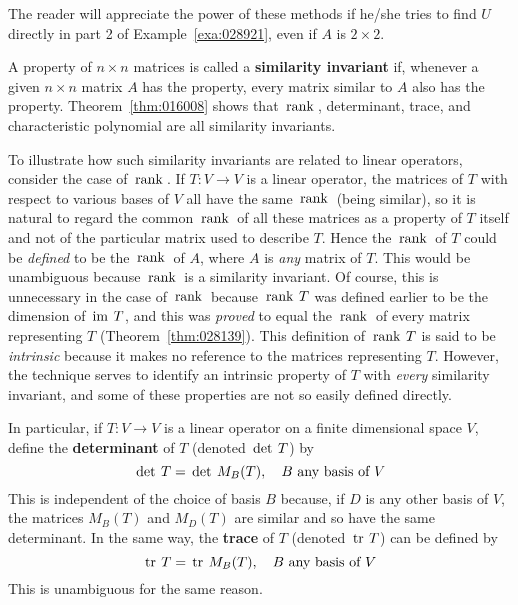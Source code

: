 \noindent The reader will appreciate the power of these methods if he/she tries to find $U$ directly in part 2 of Example~\ref{exa:028921}, even if $A$ is $2 \times 2$.


A property of $n \times n$ matrices is called a \textbf{similarity invariant} if, whenever a given $n \times n$ matrix $A$ has the property, every matrix similar to $A$ also has the property. Theorem~\ref{thm:016008} shows that $\thinspace\operatorname{rank\medspace}$, determinant, trace, and characteristic polynomial are all similarity invariants.


To illustrate how such similarity invariants are related to linear operators, consider the case of $\thinspace\operatorname{rank\medspace}$. If $T : V \to V$ is a linear operator, the matrices of $T$ with respect to various bases of $V$ all have the same $\thinspace\operatorname{rank\medspace}$ (being similar), so it is natural to regard the common $\thinspace\operatorname{rank\medspace}$ of all these matrices as a property of $T$ itself and not of the particular matrix used to describe $T$. Hence the $\thinspace\operatorname{rank\medspace}$ of $T$ could be \textit{defined} to be the $\thinspace\operatorname{rank\medspace}$ of $A$, where $A$ is \textit{any} matrix of $T$. This would be unambiguous because $\thinspace\operatorname{rank\medspace}$ is a similarity invariant. Of course, this is unnecessary in the case of $\thinspace\operatorname{rank\medspace}$ because $\thinspace\operatorname{rank \medspace}T$ was defined earlier to be the dimension of $\thinspace\operatorname{im \medspace}T$, and this was \textit{proved} to equal the $\thinspace\operatorname{rank\medspace}$ of every matrix representing $T$ (Theorem~\ref{thm:028139}). This definition of $\thinspace\operatorname{rank \medspace}T$ is said to be \textit{intrinsic} because it makes no reference to the matrices representing $T$. However, the technique serves to identify an intrinsic property of $T$ with \textit{every} similarity invariant, and some of these properties are not so easily defined directly.


In particular, if $T : V \to V$ is a linear operator on a finite dimensional space $V$, define the \textbf{determinant} of $T$ (denoted $\thinspace\operatorname{det \medspace}T$) by
\begin{equation*}
\thinspace\operatorname{det \medspace} T = \thinspace\operatorname{det \medspace} M_B(T), \quad B \mbox{ any basis of } V
\end{equation*}
This is independent of the choice of basis $B$ because, if $D$ is any other basis of $V$, the matrices $M_{B}(T)$ and $M_{D}(T)$ are similar and so have the same determinant. In the same way, the \textbf{trace} of $T$ (denoted $\thinspace\operatorname{tr \medspace}T$) can be defined by
\begin{equation*}
\thinspace\operatorname{tr \medspace} T = \thinspace\operatorname{tr \medspace} M_B(T), \quad  B \mbox{ any basis of } V
\end{equation*}
This is unambiguous for the same reason.


